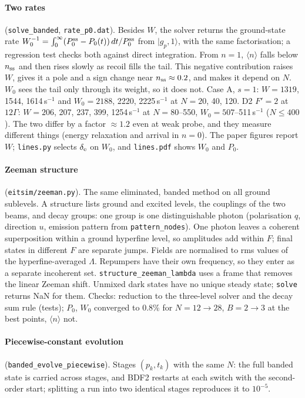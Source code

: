 \documentclass[11pt,a4paper]{article}
\newcommand{\ket}[1]{|#1\rangle}
\newcommand{\code}[1]{\texttt{#1}}
\begin{document}
\paragraph{Two rates} (\code{solve\_banded}, \code{rate\_p0.dat}). Besides $W$, the solver returns the ground-state rate $W_0^{-1}=\int_0^\infty(P_0^{\rm ss}-P_0(t))\,dt/P_0^{\rm ss}$ from $\ket{g_p,1}$, with the same factorisation; a regression test checks both against direct integration. From $n=1$, $\langle n\rangle$ falls below $n_{\rm ss}$ and then rises slowly as recoil fills the tail. This negative contribution raises $W$, gives it a pole and a sign change near $n_{\rm ss}\approx0.2$, and makes it depend on $N$. $W_0$ sees the tail only through its weight, so it does not. Case A, $s=1$: $W=1319$, 1544, 1614\,s$^{-1}$ and $W_0=2188$, 2220, 2225\,s$^{-1}$ at $N=20$, 40, 120. D2 $F'=2$ at $12\Gamma$: $W=206$, 207, 237, 399, 1254\,s$^{-1}$ at $N=80$--550, $W_0=507$--511\,s$^{-1}$ ($N\le400$). The two differ by a factor $\approx1.2$ even at weak probe, and they measure different things (energy relaxation and arrival in $n=0$). The paper figures report $W$; \code{lines.py} selects $\delta_{\rm e}$ on $W_0$, and \code{lines.pdf} shows $W_0$ and $P_0$.

\paragraph{Zeeman structure} (\code{eitsim/zeeman.py}). The same eliminated, banded method on all ground sublevels. A structure lists ground and excited levels, the couplings of the two beams, and decay groups: one group is one distinguishable photon (polarisation $q$, direction $u$, emission pattern from \code{pattern\_nodes}). One photon leaves a coherent superposition within a ground hyperfine level, so amplitudes add within $F$; final states in different $F$ are separate jumps. Fields are normalised to rms values of the hyperfine-averaged $\Lambda$. Repumpers have their own frequency, so they enter as a separate incoherent set. \code{structure\_zeeman\_lambda} uses a frame that removes the linear Zeeman shift. Unmixed dark states have no unique steady state; \code{solve} returns NaN for them. Checks: reduction to the three-level solver and the decay sum rule (tests); $P_0$, $W_0$ converged to 0.8\% for $N=12\to28$, $B=2\to3$ at the best points, $\langle n\rangle$ not.

\paragraph{Piecewise-constant evolution} (\code{banded\_evolve\_piecewise}). Stages $(p_k,t_k)$ with the same $N$: the full banded state is carried across stages, and BDF2 restarts at each switch with the second-order start; splitting a run into two identical stages reproduces it to $10^{-5}$.
\end{document}
